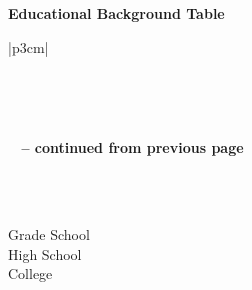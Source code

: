 \textbf{Educational Background Table}
\begin{longtable}{|p{3cm}|}
\caption{Educational Background Table.} \vspace{0.25em} \\ \hline 

\hline {} \\ \hline 
\endfirsthead

{{\bfseries \tablename\ \thetable{} -- continued from previous page}} \\
\hline {} \\ \hline 
\endhead

\hline {} \\ \hline
\endfoot

\hline \hline
\endlastfoot
Grade School \\ \hline
High School \\ \hline
College \\ \hline
\end{longtable}

